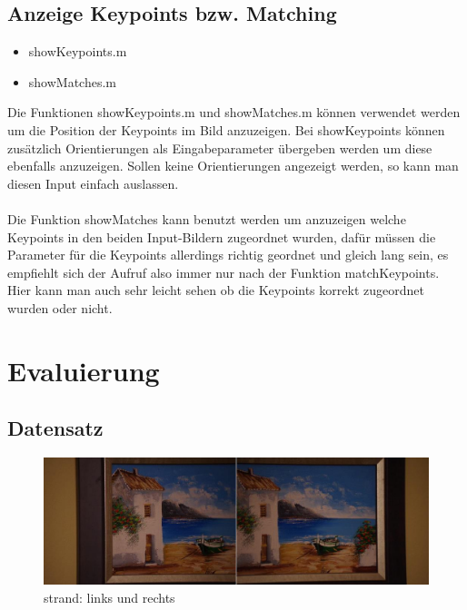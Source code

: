 \documentclass[deutsch]{scrartcl}
\begin{document}
\subsection{Anzeige Keypoints bzw. Matching}
\begin{itemize}
	\item showKeypoints.m
	\item showMatches.m
\end{itemize}
Die Funktionen showKeypoints.m und showMatches.m können verwendet werden um die Position der Keypoints im Bild anzuzeigen. Bei showKeypoints können zusätzlich Orientierungen als Eingabeparameter übergeben werden um diese ebenfalls anzuzeigen. Sollen keine Orientierungen angezeigt werden, so kann man diesen Input einfach auslassen.\\\\
Die Funktion showMatches kann benutzt werden um anzuzeigen welche Keypoints in den beiden Input-Bildern zugeordnet wurden, dafür müssen die Parameter für die Keypoints allerdings richtig geordnet und gleich lang sein, es empfiehlt sich der Aufruf also immer nur nach der Funktion matchKeypoints. Hier kann man auch sehr leicht sehen ob die Keypoints korrekt zugeordnet wurden oder nicht.

\newpage
\section{Evaluierung}

\subsection{Datensatz}

\begin{figure}[h!]
\begin{center}
\includegraphics[width=1.0\textwidth]{strand.jpg}
\caption{strand: links und rechts}
\label{fig:strand}
\end{center}
\end{figure}
\end{document}
